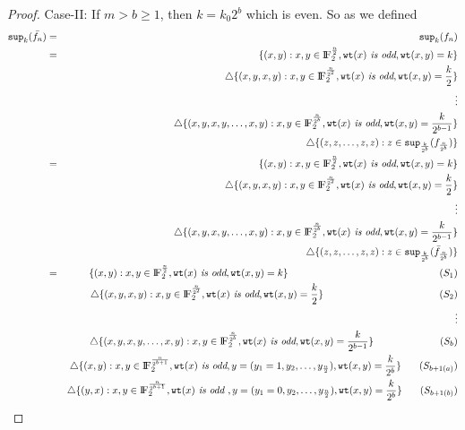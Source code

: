 \documentclass{article}[12pt]
\newcommand{\FF}{{\rm I\!F}}
\newcommand{\wt}{\mathtt{wt}}
\newcommand{\spt}{\mathtt{sup}}
\begin{document}
\begin{proof}
Case-II: If $m >b \geq1$, then $k= k_0 2^b$ which is even. So as we defined 
\begin{eqnarray*}
	\spt_{k}(\bar{f_n}) & = & \spt_k(f_n) \\
	 & = & \{(x,y) : x,y \in \FF_2^{\frac{n}{2}}, \wt(x) \textit{ is odd}, \wt(x,y) = k\} \\ & &\triangle \{(x,y,x,y) : x,y \in \FF_2^{\frac{n}{2^2}}, \wt(x) \textit{ is odd},  \wt(x,y) = \frac{k}{2}\} \\ 
	 & & \vdots \\
	 & &\triangle \{(x,y,x,y, \ldots,x,y) : x,y \in \FF_2^{\frac{n}{2^b}}, \wt(x) \textit{ is odd},  \wt(x,y) = \frac{k}{2^{b-1}}\} \\
	 & & \triangle \{(z,z,\ldots, z,z) : z \in \spt_\frac{k}{2^b}(f_{\frac{n}{2^b}})\} \\
	 & = & \{(x,y) : x,y \in \FF_2^{\frac{n}{2}}, \wt(x) \textit{ is odd}, \wt(x,y) = k\} \\ & &\triangle \{(x,y,x,y) : x,y \in \FF_2^{\frac{n}{2^2}}, \wt(x) \textit{ is odd},  \wt(x,y) = \frac{k}{2}\} \\ 
	 & & \vdots \\
	 & &\triangle \{(x,y,x,y, \ldots,x,y) : x,y \in \FF_2^{\frac{n}{2^b}}, \wt(x) \textit{ is odd},  \wt(x,y) = \frac{k}{2^{b-1}}\} \\
	 & & \triangle \{(z,z,\ldots, z,z) : z \in \spt_\frac{k}{2^b}(\bar{f}_{\frac{n}{2^b}})\} \\
	 & = & \{(x,y) : x,y \in \FF_2^{\frac{n}{2}}, \wt(x) \textit{ is odd}, \wt(x,y) = k\} \hspace{2.1in} (S_1)\\ 
	 & &\triangle \{(x,y,x,y) : x,y \in \FF_2^{\frac{n}{2^2}}, \wt(x) \textit{ is odd},  \wt(x,y) = \frac{k}{2}\} \hspace{1.61in} (S_2)\\ 
	 & & \vdots \\
	 & &\triangle \{(x,y,x,y, \ldots,x,y) : x,y \in \FF_2^{\frac{n}{2^b}}, \wt(x) \textit{ is odd},  \wt(x,y) = \frac{k}{2^{b-1}}\} \hspace{0.92in}(S_b)\\
	 & &  \triangle \{(x,y) : x,y \in \FF_2^{\frac{n}{2^{b+1}}}, \wt(x) \textit{ is odd}, y= (y_1= 1, y_2, \ldots, y_{\frac{n}{2}}), \wt(x,y) = \frac{k}{2^b} \}  \hspace{0.25in}(S_{b+1(a)}) \\ 
	 & &	\triangle \{ (y,x) : x,y \in \FF_2^{\frac{n}{2^{b+1}}}, \wt(x) \textit{ is odd }, y= (y_1=0,y_2,\ldots, y_{\frac{n}{2}}), \wt(x,y)= \frac{k}{2^b} \}  \hspace{0.25in}(S_{b+1(b)})  \\

\end{eqnarray*}
\end{proof}
\end{document}
